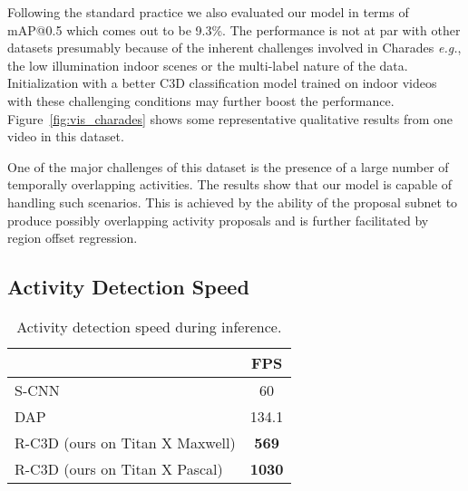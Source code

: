 \documentclass[10pt,twocolumn,letterpaper]{article}
\begin{document}
Following the standard practice we also evaluated our model in terms of mAP@0.5 which comes out to be 9.3\%.
The performance is not at par with other datasets presumably because of the inherent challenges involved in Charades \textit{e.g.}, the low illumination indoor scenes or the multi-label nature of the data.
Initialization with a better C3D classification model trained on indoor videos with these challenging conditions may further boost the performance.
Figure~\ref{fig:vis_charades} shows some representative qualitative results from one video in this dataset.

One of the major challenges of this dataset is the presence of a large number of temporally overlapping activities.
The results show that our model is capable of handling such scenarios.
This is achieved by the ability of the proposal subnet to produce possibly overlapping activity proposals and is further facilitated by region offset regression.

\subsection{Activity Detection Speed}
\label{exp:speed}
\begin{table}[!t]
\centering
\caption{Activity detection speed during inference.}
\small
\begin{tabular}{l || c } 
\hline
~ & FPS   \\ \hline
S-CNN~\cite{shou2016temporal} & 60   \\ DAP~\cite{escorcia2016daps} & 134.1   \\ \hline
R-C3D (ours on Titan X Maxwell)& \bf{569}  \\ \hline 
R-C3D (ours on Titan X Pascal)& \bf{1030}  \\ \hline 
\end{tabular}
\vspace{-0.2in}
\label{res:speed}
\end{table}
\end{document}
